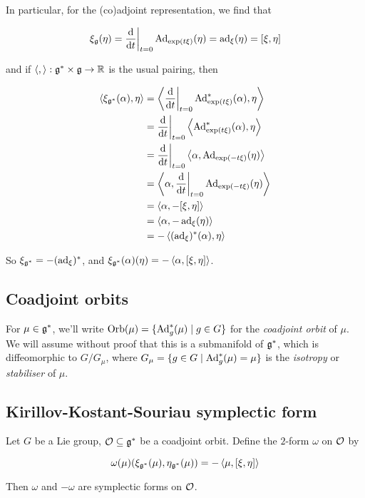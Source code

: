 \documentclass{article}
\begin{document}
In particular, for the (co)adjoint representation, we find that

\[\xi_{\mathfrak{g}}(\eta) = \dv{t}\bigg\vert_{t=0}\operatorname{Ad}_{\exp(t\xi)}(\eta) = \operatorname{ad}_\xi(\eta) = [\xi, \eta]\]

and if \(\left\langle , \right\rangle : \mathfrak{g}^* \times \mathfrak{g} \to \mathbb{R}\) is the usual pairing, then

\begin{align*}
    \left\langle \xi_{\mathfrak{g}^*}(\alpha), \eta \right\rangle &= \left\langle \dv{t}\bigg\vert_{t=0}\operatorname{Ad}_{\exp(t\xi)}^*(\alpha), \eta \right\rangle \\
    &= \dv{t}\bigg\vert_{t=0}\left\langle \operatorname{Ad}_{\exp(t\xi)}^*(\alpha), \eta \right\rangle \\
    &= \dv{t}\bigg\vert_{t=0}\left\langle \alpha, \operatorname{Ad}_{\exp(-t\xi)}(\eta) \right\rangle \\
    &= \left\langle \alpha, \dv{t}\bigg\vert_{t=0}\operatorname{Ad}_{\exp(-t\xi)}(\eta) \right\rangle \\
    &= \left\langle \alpha, -[\xi, \eta] \right\rangle \\
    &= \left\langle \alpha, -\operatorname{ad}_\xi(\eta) \right\rangle \\
    &= -\left\langle (\operatorname{ad}_\xi)^*(\alpha), \eta \right\rangle
\end{align*}

So \(\xi_{\mathfrak{g}^*} = -(\operatorname{ad}_\xi)^*\), and \(\xi_{\mathfrak{g}^*}(\alpha)(\eta) = -\left\langle \alpha, [\xi, \eta] \right\rangle\).

\subsection{Coadjoint orbits}

For \(\mu \in \mathfrak{g}^*\), we'll write \(\operatorname{Orb}(\mu) = \{\operatorname{Ad}_g^*(\mu) \mid g \in G\}\) for the \emph{coadjoint orbit} of \(\mu\). We will assume without proof that this is a submanifold of \(\mathfrak{g}^*\), which is diffeomorphic to \(G/G_\mu\), where \(G_\mu = \{g \in G \mid \operatorname{Ad}_g^*(\mu) = \mu\}\) is the \emph{isotropy} or \emph{stabiliser} of \(\mu\).

\subsection{Kirillov-Kostant-Souriau symplectic form}

\begin{theorem}
    Let \(G\) be a Lie group, \(\mathcal{O} \subseteq \mathfrak{g}^*\) be a coadjoint orbit. Define the \(2\)-form \(\omega\) on \(\mathcal{O}\) by

    \[\omega(\mu)(\xi_{\mathfrak{g}^*}(\mu), \eta_{\mathfrak{g}^*}(\mu)) = -\left\langle \mu, [\xi, \eta] \right\rangle\]

    Then \(\omega\) and \(-\omega\) are symplectic forms on \(\mathcal{O}\).
\end{theorem}
\end{document}
